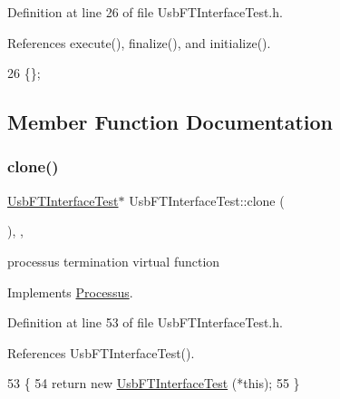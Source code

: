 Definition at line 26 of file Usb\+F\+T\+Interface\+Test.\+h.



References execute(), finalize(), and initialize().


\begin{DoxyCode}
26 \{\}; 
\end{DoxyCode}


\subsection{Member Function Documentation}
\mbox{\label{classUsbFTInterfaceTest_af4eae62d10c30e060d19aa48621ffb54}} 
\subsubsection{\texorpdfstring{clone()}{clone()}}
{\footnotesize\ttfamily \hyperlink{classUsbFTInterfaceTest_1_1UsbFTInterfaceTest}{Usb\+F\+T\+Interface\+Test}$\ast$ Usb\+F\+T\+Interface\+Test\+::clone (\begin{DoxyParamCaption}{ }\end{DoxyParamCaption})\hspace{0.3cm}{\ttfamily [inline]}, {\ttfamily [protected]}, {\ttfamily [virtual]}}

processus termination virtual function 

Implements \hyperlink{classProcessus_aca8856f6d6d7b7e1fe941f298dcbb502}{Processus}.



Definition at line 53 of file Usb\+F\+T\+Interface\+Test.\+h.



References Usb\+F\+T\+Interface\+Test().


\begin{DoxyCode}
53                              \{
54     \textcolor{keywordflow}{return} \textcolor{keyword}{new} \hyperlink{classUsbFTInterfaceTest_ae83ca1c95a132a896f8c2c0d9a903add}{UsbFTInterfaceTest} (*\textcolor{keyword}{this});
55   \}
\end{DoxyCode}
\mbox{\label{classUsbFTInterfaceTest_a1e6d0b0e0c1c58238e78c5b910289b68}} 
